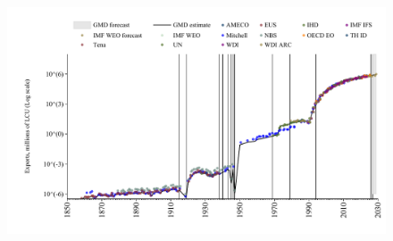 \documentclass[12pt,a4paper,landscape]{article}
\begin{document}
\begin{adjustbox}{max totalsize={\paperwidth}{\paperheight},center}
\begin{minipage}[t][\textheight][t]{\textwidth}
\begin{table}[H]
\begin{tabular}{|l|l|l|}
\hline
\end{tabular}
\end{table}
\begin{figure}[H]
\centering
\includegraphics[width=\textwidth,height=0.6\textheight,keepaspectratio]{graphs/ROU_exports.pdf}
\end{figure}
\end{minipage}
\end{adjustbox}
\end{document}
